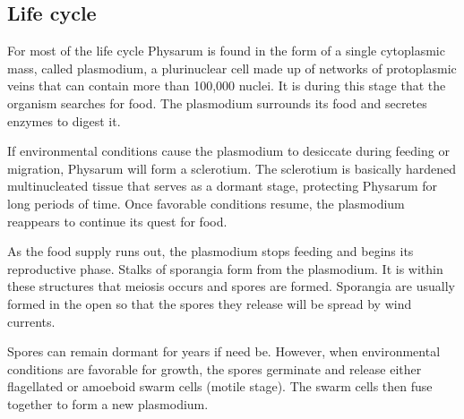 \subsection{Life cycle}
For most of the life cycle Physarum is found in the form of a single cytoplasmic mass, called plasmodium, a plurinuclear cell made up of networks of protoplasmic veins that can contain more than 100,000 nuclei. It is during this stage that the organism searches for food. The plasmodium surrounds its food and secretes enzymes to digest it.
\par
If environmental conditions cause the plasmodium to desiccate during feeding or migration, Physarum will form a sclerotium. The sclerotium is basically hardened multinucleated tissue that serves as a dormant stage, protecting Physarum for long periods of time. Once favorable conditions resume, the plasmodium reappears to continue its quest for food.
\par
As the food supply runs out, the plasmodium stops feeding and begins its reproductive phase. Stalks of sporangia form from the plasmodium. It is within these structures that meiosis occurs and spores are formed. Sporangia are usually formed in the open so that the spores they release will be spread by wind currents.
\par
Spores can remain dormant for years if need be. However, when environmental conditions are favorable for growth, the spores germinate and release either flagellated or amoeboid swarm cells (motile stage). The swarm cells then fuse together to form a new plasmodium. 

